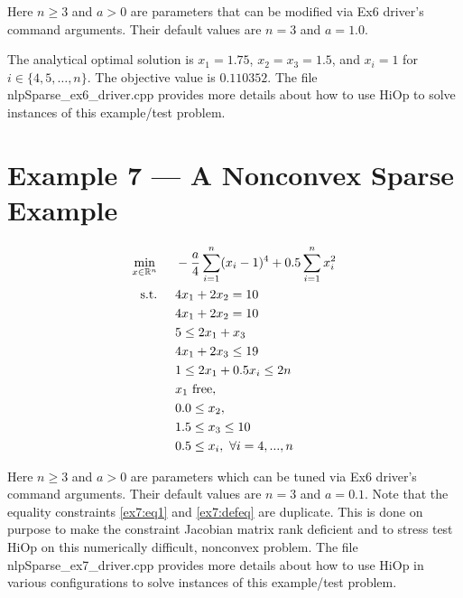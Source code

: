 \documentclass[11pt,letterpaper]{article}
\begin{document}
Here $n\geq3$ and $a>0$ are parameters that can be modified via Ex6 driver's command arguments. Their default values are $n=3$ and $a=1.0$.

The analytical optimal solution is  $x_1=1.75$, $x_2=x_3=1.5$, and $x_i=1$ for $i\in \{4,5,\ldots,n\}$. The objective value is $0.110352$. The file nlpSparse\_ex6\_driver.cpp provides more details about how to use HiOp to solve instances of this example/test problem.

\section{Example 7 --- A Nonconvex Sparse Example}
\begin{align}
    &&&&\min_{x\in\mathbb{R}^n} & \hspace{0.5cm} -\frac{a}{4}\sum_{i=1}^{n} (x_i-1)^4 + 0.5\sum_{i=1}^{n} x_i^2&&&& \label{ex7:obj}\\
    &&&&\textnormal{s.t.} &\hspace{0.5cm}  4x_1+2x_2 = 10 &&&& \label{ex7:eq1}\\
    &&&&& \hspace{0.5cm}  4x_1+2x_2 = 10 &&&& \label{ex7:defeq}\\
    &&&&& \hspace{0.5cm}  5 \leq  2x_1 + x_3                 &&&& \label{ex7:ineq1}\\
    &&&&& \hspace{0.5cm}          4x_1      + 2x_3   \leq 19 &&&& \label{ex7:defineq}\\
    &&&&& \hspace{0.5cm}  1 \leq  2x_1      + 0.5x_i \leq 2n &&&& \label{ex7:ineq2}\\
    &&&&& \hspace{0.5cm}  x_1~\textnormal{free}, &&&& \label{ex7:varb1}\\
    &&&&& \hspace{0.5cm}  0.0 \leq x_2, &&&& \label{ex7:varb2}\\
    &&&&& \hspace{0.5cm}  1.5 \leq x_3 \leq 10  &&&& \label{ex7:varb3}\\
    &&&&& \hspace{0.5cm}  0.5 \leq x_i, \ \forall i=4,...,n    &&& \label{ex7:varb4}
\end{align}

Here $n\geq3$ and $a>0$ are parameters which can be tuned via Ex6 driver's command arguments. Their default values are  $n=3$ and $a=0.1$. Note that the equality constraints \eqref{ex7:eq1} and \eqref{ex7:defeq} are duplicate. This is done on purpose to make the constraint Jacobian matrix rank deficient and to stress test HiOp on this numerically difficult, nonconvex problem. The file nlpSparse\_ex7\_driver.cpp provides more details about how to use HiOp in various configurations to solve instances of this example/test problem.


\end{document}
